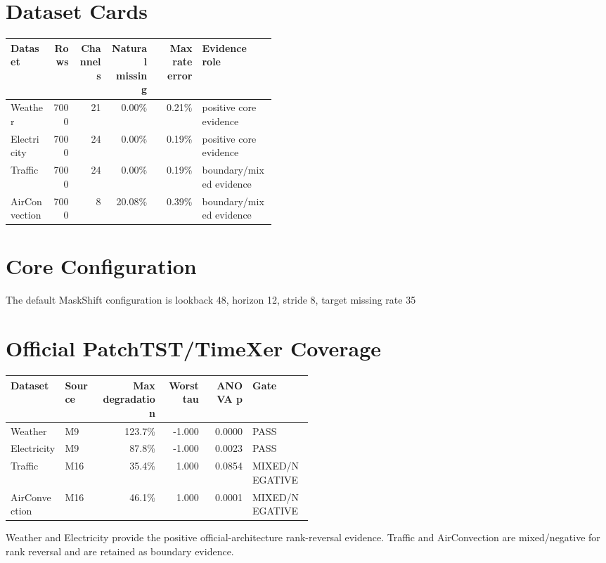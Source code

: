 \documentclass[10pt]{article}
\begin{document}
\section{Dataset Cards}
\small
\begin{longtable}{p{0.16\linewidth}rrrrp{0.28\linewidth}}
\toprule
Dataset & Rows & Channels & Natural missing & Max rate error & Evidence role\\
\midrule
Weather & 7000 & 21 & 0.00\% & 0.21\% & positive core evidence\\
Electricity & 7000 & 24 & 0.00\% & 0.19\% & positive core evidence\\
Traffic & 7000 & 24 & 0.00\% & 0.19\% & boundary/mixed evidence\\
AirConvection & 7000 & 8 & 20.08\% & 0.39\% & boundary/mixed evidence\\
\bottomrule
\end{longtable}
\normalsize

\section{Core Configuration}
The default MaskShift configuration is lookback 48, horizon 12, stride 8, target missing rate 35%

\section{Official PatchTST/TimeXer Coverage}
\small
\begin{longtable}{p{0.18\linewidth}p{0.12\linewidth}rrrp{0.2\linewidth}}
\toprule
Dataset & Source & Max degradation & Worst tau & ANOVA p & Gate\\
\midrule
Weather & M9 & 123.7\% & -1.000 & 0.0000 & PASS\\
Electricity & M9 & 87.8\% & -1.000 & 0.0023 & PASS\\
Traffic & M16 & 35.4\% & 1.000 & 0.0854 & MIXED/NEGATIVE\\
AirConvection & M16 & 46.1\% & 1.000 & 0.0001 & MIXED/NEGATIVE\\
\bottomrule
\end{longtable}
\normalsize
Weather and Electricity provide the positive official-architecture rank-reversal evidence. Traffic and AirConvection are mixed/negative for rank reversal and are retained as boundary evidence.
\end{document}
